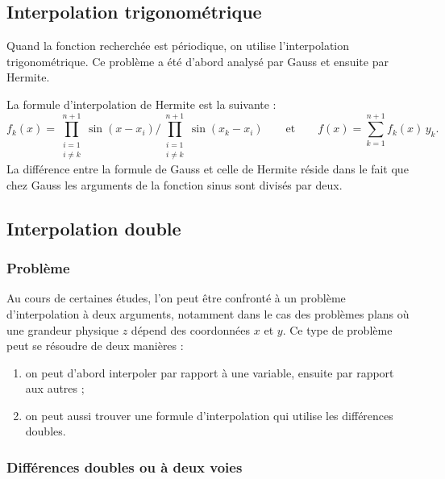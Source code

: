 \subsection{Interpolation trigonométrique}

Quand la fonction recherchée est périodique, on utilise l'interpolation
trigonométrique. Ce problème a été d'abord analysé par Gauss et ensuite par
Hermite.

La formule d'interpolation de Hermite est la suivante :
\[
  f_k(x) = \prod_{\substack{i=1\\ i\neq k}}^{n+1}\sin(x - x_i)
           \Bigg/ \prod_{\substack{i=1\\ i\neq k}}^{n+1}\sin(x_k - x_i)
  \qquad\text{et}\qquad
  f(x) = \sum_{k=1}^{n+1} f_k(x)\,y_k .
\]
La différence entre la formule de Gauss et celle de Hermite réside dans le
fait que chez Gauss les arguments de la fonction sinus sont divisés par deux.

\subsection{Interpolation double}

\subsubsection{Problème}

Au cours de certaines études, l'on peut être confronté à un problème
d'interpolation à deux arguments, notamment dans le cas des problèmes plans où
une grandeur physique $z$ dépend des coordonnées $x$ et $y$. Ce type de
problème peut se résoudre de deux manières :
\begin{enumerate}[label=(\roman*)]
  \item on peut d'abord interpoler par rapport à une variable, ensuite par
        rapport aux autres ;
  \item on peut aussi trouver une formule d'interpolation qui utilise les
        différences doubles.
\end{enumerate}

\subsubsection{Différences doubles ou à deux voies}

